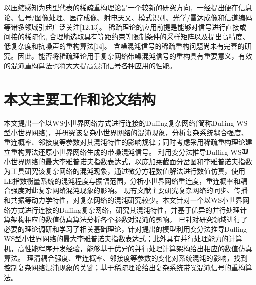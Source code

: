 以压缩感知为典型代表的稀疏重构理论是一个较新的研究方向，一经提出便在信息论、信号/图像处理、医疗成像、射电天文、模式识别、光学/雷达成像和信道编码等诸多领域引起广泛关注[12,13]。
稀疏理论的应用前提是能够对信号进行直接或间接的稀疏化, 合理地选取具有等距约束等限制条件的采样矩阵以及提出高精度、低复杂度和抗噪声的重构算法[14]。
含噪混沌信号的稀疏重构问题尚未有完善的研究。因此，能否将稀疏理论用于复杂网络带噪混沌信号的重构具有重要意义，有效的混沌重构算法也将大大提高混沌信号各种应用的性能。
\section{本文主要工作和论文结构}
本文提出一个以WS小世界网络方式进行连接的Duffing复杂网络(简称Duffing-WS型小世界网络)，并研究该复杂小世界网络的混沌现象，分析复杂系统耦合强度、重连概率、邻接度等参数对其混沌特性的影响规律；同时考虑采用稀疏重构理论建立重构算法还原小世界网络生成的带噪混沌信号。
利用变分法推导Duffing-WS型小世界网络的最大李雅普诺夫指数表达式，以庞加莱截面分岔图和李雅普诺夫指数为工具研究该复杂网络的混沌现象，通过微分方程数值解法进行数值仿真，使用LE指数衡量系统的混沌程度与振幅范围，分析小世界网络重连度，重连概率和耦合强度对此复杂网络混沌现象的影响。
现有文献主要研究复杂网络的同步、传播和共振等动力学特性，对复杂网络的混沌研究较少。本文针对一个以WS小世界网络方式进行连接的Duffing复杂网络，研究其混沌特性，并基于优异的并行处理计算架构相应的数值仿真算法分析各个参数对混沌的影响。
已针对研究领域进行了必要的理论调研和学习了相关基础理论，针对提出的模型利用变分法推导Duffing-WS型小世界网络的最大李雅普诺夫指数表达式；此外具有并行处理能力的计算机，高性能程序开发经验，能够基于优异的并行处理计算架构给出相应的数值仿真算法。
理清耦合强度、重连概率、邻接度等参数的变化对系统混沌的影响，找到控制复杂网络混沌现象的关键；基于稀疏理论给出复杂系统带噪混沌信号的重构算法。
